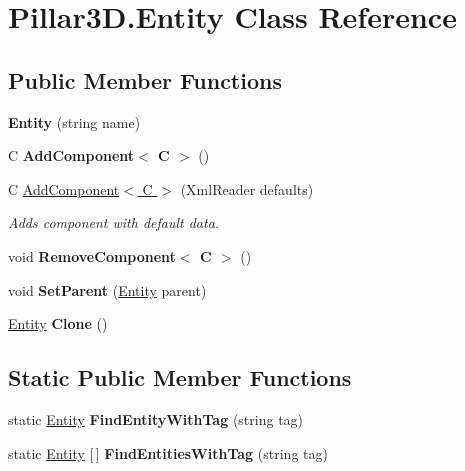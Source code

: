 \hypertarget{class_pillar3_d_1_1_entity}{}\section{Pillar3\+D.\+Entity Class Reference}
\label{class_pillar3_d_1_1_entity}
\subsection*{Public Member Functions}
\begin{DoxyCompactItemize}
\item 
\mbox{\label{class_pillar3_d_1_1_entity_a528c56df6fdb8bef5970863c3642d26b}} 
{\bfseries Entity} (string name)
\item 
\mbox{\label{class_pillar3_d_1_1_entity_acf50462d86c34af5e6474442bcec5bcb}} 
C {\bfseries Add\+Component$<$ C $>$} ()
\item 
C \hyperlink{class_pillar3_d_1_1_entity_aa074e5244bd8980eebc56863a6d77aaf}{Add\+Component$<$ C $>$} (Xml\+Reader defaults)
\begin{DoxyCompactList}\small\item\em Adds component with default data. \end{DoxyCompactList}\item 
\mbox{\label{class_pillar3_d_1_1_entity_ab7bd626b58ae21c122e9978e4c2a1cdb}} 
void {\bfseries Remove\+Component$<$ C $>$} ()
\item 
\mbox{\label{class_pillar3_d_1_1_entity_ad290b845ff7fe3713b74b35c90942513}} 
void {\bfseries Set\+Parent} (\hyperlink{class_pillar3_d_1_1_entity}{Entity} parent)
\item 
\mbox{\label{class_pillar3_d_1_1_entity_a0a827698ed7b233cf4fe5e6301054fbc}} 
\hyperlink{class_pillar3_d_1_1_entity}{Entity} {\bfseries Clone} ()
\end{DoxyCompactItemize}
\subsection*{Static Public Member Functions}
\begin{DoxyCompactItemize}
\item 
\mbox{\label{class_pillar3_d_1_1_entity_a1be1caaff8af11892461fb9110dc443d}} 
static \hyperlink{class_pillar3_d_1_1_entity}{Entity} {\bfseries Find\+Entity\+With\+Tag} (string tag)
\item 
\mbox{\label{class_pillar3_d_1_1_entity_af0c227ec11474cac19dc026638690761}} 
static \hyperlink{class_pillar3_d_1_1_entity}{Entity} \mbox{[}$\,$\mbox{]} {\bfseries Find\+Entities\+With\+Tag} (string tag)
\end{DoxyCompactItemize}
